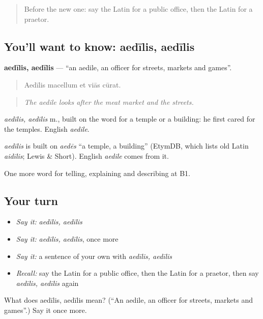 \begin{quote}
Before the new one: say the Latin for a public office, then the Latin for a praetor.
\end{quote}

\subsection*{You'll want to know: aedīlis, aedīlis}
\textbf{aedīlis, aedīlis} — \textquotedblleft{}an aedile, an officer for streets, markets and games\textquotedblright{}.

\begin{quote}
Aedīlis macellum et viās cūrat.
\end{quote}

\begin{quote}
\emph{The aedile looks after the meat market and the streets.}
\end{quote}

\emph{aedīlis, aedīlis} m., built on the word for a temple or a building: he first cared for the temples. English \emph{aedile}.

\begin{cousinweb}
\emph{aedīlis} is built on \emph{aedēs} \textquotedblleft{}a temple, a building\textquotedblright{} (EtymDB, which lists old Latin \emph{aidīlis}; Lewis \& Short). English \emph{aedile} comes from it.
\end{cousinweb}

\begin{grammarlens}[title={What you've built}]
One more word for telling, explaining and describing at B1.
\end{grammarlens}

\subsection*{Your turn}
\begin{itemize}
\raggedright
  \item \emph{Say it:} \emph{aedīlis, aedīlis}
  \item \emph{Say it:} \emph{aedīlis, aedīlis}, once more
  \item \emph{Say it:} a sentence of your own with \emph{aedīlis, aedīlis}
  \item \emph{Recall:} say the Latin for a public office, then the Latin for a praetor, then say \emph{aedīlis, aedīlis} again
\end{itemize}

\begin{tcolorbox}[breakable,colback=teal!4,colframe=teal!35!black,title={Before you move on}]
What does aedīlis, aedīlis mean? (\textquotedblleft{}An aedile, an officer for streets, markets and games\textquotedblright{}.) Say it once more.
\end{tcolorbox}
